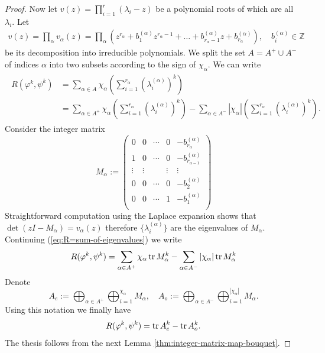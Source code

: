 \documentclass[12pt, a4paper]{amsart}
\def\Z{{\mathbb Z}}
\def\tr{\mathop{\rm tr}\nolimits}
\begin{document}
\begin{proof}
  Now let $v(z) = \prod_{i=1}^r (\lambda_i - z)$ be a polynomial roots of which are all $\lambda_i$.
  Let
  \begin{align*}
    v(z) = \prod_{\alpha} v_{\alpha}(z)
    = \prod_{\alpha} \left( z^{r_\alpha} + b_1^{(\alpha)} z^{r_\alpha-1}  + \dots +
      b_{r_\alpha - 1}^{(\alpha)} z + b_{r_\alpha}^{(\alpha)} \right),
      \quad b_i^{(\alpha)} \in \Z
  \end{align*}
  be its decomposition into irreducible polynomials.
  We split the set $A = A^+ \cup A^-$ of indices $\alpha$ into two subsets according to the sign of $\chi_\alpha$.
  We can write
  \begin{align}\label{eq:R=sum-of-eigenvalues}
  \begin{split}
    R(\varphi^k, \psi^k)
    &= \sum_{\alpha \in A} \chi_\alpha \left( \sum_{i=1}^{r_\alpha} \left(\lambda^{(\alpha)}_i\right)^k \right) \\
    &= \sum_{\alpha \in A^+} \chi_\alpha \left( \sum_{i=1}^{r_\alpha} \left(\lambda^{(\alpha)}_i\right)^k \right)
      - \sum_{\alpha \in A^-} |\chi_\alpha| \left( \sum_{i=1}^{r_\alpha} \left(\lambda^{(\alpha)}_i\right)^k \right).
  \end{split}
  \end{align}
  Consider the integer matrix
  \begin{equation*}
    M_\alpha := \begin{pmatrix}
        0      & 0      & \dotsb & 0      & - b_{r_\alpha}^{(\alpha)} \\
        1      & 0      & \dotsb & 0      & - b_{r_{\alpha-1}}^{(\alpha)} \\
        \vdots & \vdots &        & \vdots & \vdots \\
        0      & 0      & \dotsb & 0      & - b_{2}^{(\alpha)} \\
        0      & 0      & \dotsb & 1      & - b_{1}^{(\alpha)} \\
    \end{pmatrix}
  \end{equation*}
  Straightforward computation using the Laplace expansion shows that $\det(zI-M_\alpha) = v_\alpha(z)$
  therefore $\{\lambda_i^{(\alpha)}\}$ are the eigenvalues of $M_\alpha$.
  Continuing (\ref{eq:R=sum-of-eigenvalues}) we write
  \begin{equation*}
     R(\varphi^k, \psi^k)
     = \sum_{\alpha \in A^+} \chi_\alpha \tr M_\alpha^k - \sum_{\alpha \in A^-} |\chi_\alpha| \tr M_\alpha^k
  \end{equation*}
  Denote
  \begin{equation*}
    A_e := \bigoplus_{\alpha \in A^+} \bigoplus_{i=1}^{\chi_\alpha} M_\alpha, \quad
    A_o := \bigoplus_{\alpha \in A^-} \bigoplus_{i=1}^{|\chi_\alpha|} M_\alpha.
  \end{equation*}
  Using this notation we finally have
  \[
    R(\varphi^k, \psi^k) = \tr A_e^k - \tr A_o^k.
  \]
  The thesis follows from the next Lemma \ref{thm:integer-matrix-map-bouquet}.
\end{proof}
\end{document}
